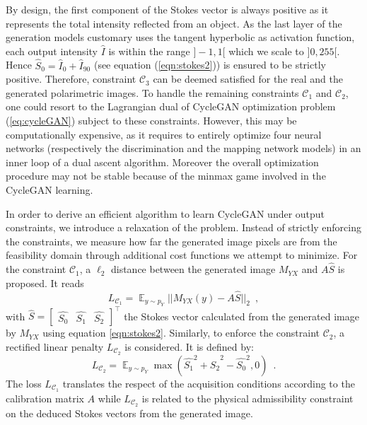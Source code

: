 By design, the first component of the Stokes vector is always positive as it represents the total intensity reflected from an object.  As the last layer of the generation models customary uses the tangent hyperbolic as activation function, each output intensity $\hat I$ is within the range $]-1,1[$ which we scale to $]0,255[$. Hence $\hat{S}_0=\hat{I}_0+\hat{I}_{90}$ (see equation (\ref{eqn:stokes2})) is ensured to be strictly positive. Therefore, constraint $\mathcal{C}_3$ can be deemed satisfied for the real and the generated polarimetric images. To handle the remaining constraints $\mathcal{C}_1$ and $\mathcal{C}_2$, one could resort to the Lagrangian dual of CycleGAN optimization problem (\ref{eq:cycleGAN}) subject to these constraints. However, this may be computationally expensive, as it requires to entirely optimize four neural networks (respectively the discrimination and the mapping network models) in an inner loop of a dual ascent algorithm. Moreover the overall optimization procedure may not be stable because of the minmax game involved in the CycleGAN learning. 

In order to derive  an efficient algorithm to learn CycleGAN under output constraints, we introduce a relaxation of the problem. Instead of strictly enforcing the constraints, we measure how far the generated image pixels are from the feasibility domain through additional cost functions we attempt to minimize.
%
For the constraint $\mathcal{C}_1$, a $\ell_2$ distance between the generated image $M_{YX}$ and $A\hat{S}$ is proposed. It reads
%
\begin{equation}
L_{\mathcal{C}_1} = \mathop{\mathbb{E}}_{y\sim p_Y} ||M_{YX}(y) - A\hat{S}||_2\enspace,  \nonumber
\label{eqn:ls}
\end{equation}
%
with $\hat{S}=\begin{bmatrix}
\hat{S_0} & \hat{S_1} & \hat{S_2}
\end{bmatrix}^\top$ the Stokes vector calculated from the generated image by $M_{YX}$ using equation \eqref{eqn:stokes2}.
%
Similarly, to enforce the constraint $\mathcal{C}_2$, a rectified linear penalty $L_{\mathcal{C}_2}$ is considered. It is defined by:
\begin{equation}
L_{\mathcal{C}_2} = \mathop{\mathbb{E}}_{y\sim p_Y}  \max\left(\hat{S_1}^2 + \hat{S_2}^2 -
\hat{S_0}^2, 0 \right)\enspace.\nonumber
\label{eqn:lreg}
\end{equation}
%
The loss $L_{\mathcal{C}_1}$ translates the respect of the acquisition conditions according to the calibration matrix $A$ while  $L_{\mathcal{C}_2}$ is related to the physical admissibility constraint on the deduced Stokes vectors from the generated image.

